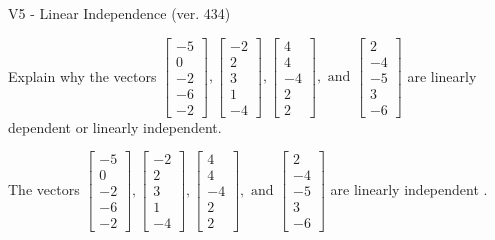 \begin{exercise}
  \begin{exerciseTitle}V5 - Linear Independence (ver. 434)\end{exerciseTitle}
  \begin{exerciseStatement}
    Explain why the vectors \(\left[\begin{array}{r}
-5 \\
0 \\
-2 \\
-6 \\
-2
\end{array}\right] , \left[\begin{array}{r}
-2 \\
2 \\
3 \\
1 \\
-4
\end{array}\right] , \left[\begin{array}{r}
4 \\
4 \\
-4 \\
2 \\
2
\end{array}\right] , \text{ and } \left[\begin{array}{r}
2 \\
-4 \\
-5 \\
3 \\
-6
\end{array}\right]\) are linearly dependent or linearly independent.	


  \end{exerciseStatement}
  \begin{exerciseAnswer}
   The vectors \(\left[\begin{array}{r}
-5 \\
0 \\
-2 \\
-6 \\
-2
\end{array}\right] , \left[\begin{array}{r}
-2 \\
2 \\
3 \\
1 \\
-4
\end{array}\right] , \left[\begin{array}{r}
4 \\
4 \\
-4 \\
2 \\
2
\end{array}\right] , \text{ and } \left[\begin{array}{r}
2 \\
-4 \\
-5 \\
3 \\
-6
\end{array}\right]\) are 
  	 linearly independent  .
  


  \end{exerciseAnswer}
\end{exercise}